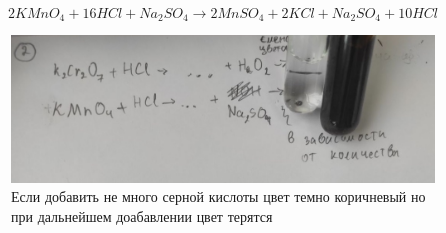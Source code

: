 \begin{equation} 
    2KMnO_4 + 16HCl + Na_2SO_4 \xrightarrow{} 
    2MnSO_4 + 2KCl + Na_2SO_4 + 10HCl 
\end{equation} 
\begin{figure}[h]
    \centering
    \includegraphics[width=1\linewidth]{Ex_3/Ex_3_2_2.jpg}
     \caption{Если добавить не много серной кислоты цвет темно коричневый но при дальнейшем доабавлении цвет терятся}
    \label{ex_2_1}
\end{figure}
